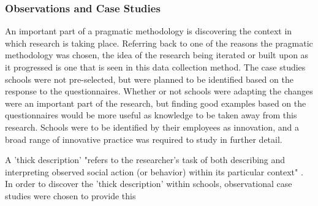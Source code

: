 \subsubsection{Observations and Case Studies}

An important part of a pragmatic methodology is discovering the context in which research is taking place. Referring back to one of the reasons the pragmatic methodology was chosen, the idea of the research being iterated or built upon as it progressed is one that is seen in this data collection method. The case studies schools were not pre-selected, but were planned to be identified based on the response to the questionnaires. Whether or not schools were adapting the changes were an important part of the research, but finding good examples based on the questionnaires would be more useful as knowledge to be taken away from this research. Schools were to be identified by their employees as innovation, and a broad range of innovative practice was required to study in further detail.

A 'thick description' "refers to the researcher’s task of both describing and interpreting observed social action (or behavior) within its particular context" \cite[p. 543]{thickdescription}. In order to discover the 'thick description' within schools, observational case studies were chosen to provide this 


